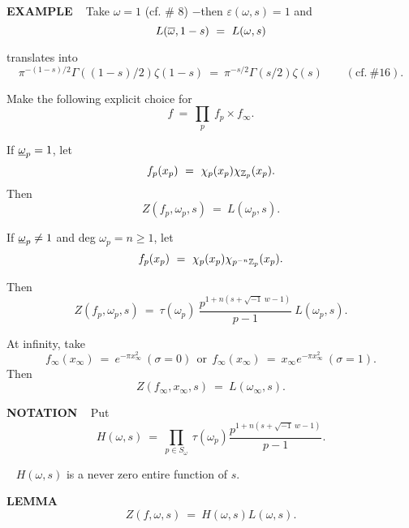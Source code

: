 \begin{x}{\small\bf EXAMPLE} \ %
Take $\omega = 1$ (cf. \# 8) $-$then $\varepsilon(\omega,s) = 1$ and
\[
L(\ov{\omega}, 1 - s) \ = \ L(\omega,s)
\]
\end{x}
\vspace{0.1cm}
translates into 
\[
\pi^{-(1-s)/2} \Gamma((1-s)/2) \zeta(1-s) \ = \ \pi^{-s/2}\Gamma(s/2) \zeta(s) \qquad (\text{cf.} \ \# 16).
\]
\vspace{0.1cm}

Make the following explicit choice for 
\[
f \ = \ \prod_p \ f_p \times f_\infty.
\]

\qquad \textbullet \quad If $\underline{\omega}_p = 1$, let
\[
f_p(x_p) \ = \ \chi_p(x_p) \chi_{\mathbb{Z}_p}(x_p).
\]
Then
\[
Z(f_p,\omega_p,s) \ = \ L(\omega_p,s).
\]

\qquad \textbullet \quad If $\underline{\omega}_p \neq 1$ and deg $\omega_p = n \geq 1$, let
\[
f_p(x_p) \ = \ \chi_p(x_p) \chi_{p^{-n}\mathbb{Z}_p} (x_p).
\]

Then 
\[
Z(f_p, \omega_p, s) \ = \ \tau(\omega_p) \ \frac{p^{1 + n(s + \sqrt{-1} \ w - 1)}}{p-1} \ L(\omega_p,s).
\]

At infinity, take 
\[
f_\infty(x_\infty)  \ = \ e^{-\pi x_\infty^2} \ (\sigma = 0) \ \ \text{or} \ \  
f_\infty(x_\infty)  \ = \ x_\infty e^{-\pi x_\infty^2} \ (\sigma = 1).
\]
Then
\[
Z(f_\infty,x_\infty,s) \ = \ L(\omega_\infty,s).
\]
\vspace{0.1cm}

\begin{x}{\small\bf NOTATION} \ %
Put
\[
H(\omega,s) \ = \ \prod\limits_{p \in S_\omega} \ \tau(\omega_p) \frac{p^{1 + n(s + \sqrt{-1} \ w - 1)}}{p-1}.
\]
\end{x}

\vspace{0.1cm}


\begin{x}{\small\bf \un{N.B.}} \ %
$H(\omega,s)$ is a never zero entire function of $s$.
\end{x}

\vspace{0.1cm}

\begin{x}{\small\bf LEMMA} \ %
\[
Z(f,\omega,s) \ = \  H(\omega,s) L(\omega,s).
\]
\end{x}

